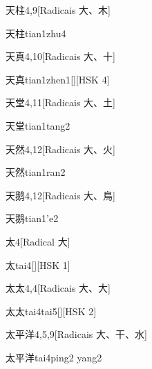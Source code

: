 \begin{entry}{天柱}{4,9}[Radicais ⼤、⽊]
  \begin{phonetics}{天柱}{tian1zhu4}
  \end{phonetics}
\end{entry}

\begin{entry}{天真}{4,10}[Radicais ⼤、⼗]
  \begin{phonetics}{天真}{tian1zhen1}[][HSK 4]
  \end{phonetics}
\end{entry}

\begin{entry}{天堂}{4,11}[Radicais ⼤、⼟]
  \begin{phonetics}{天堂}{tian1tang2}
  \end{phonetics}
\end{entry}

\begin{entry}{天然}{4,12}[Radicais ⼤、⽕]
  \begin{phonetics}{天然}{tian1ran2}
  \end{phonetics}
\end{entry}

\begin{entry}{天鹅}{4,12}[Radicais ⼤、⿃]
  \begin{phonetics}{天鹅}{tian1'e2}
  \end{phonetics}
\end{entry}

\begin{entry}{太}{4}[Radical ⼤]
  \begin{phonetics}{太}{tai4}[][HSK 1]
  \end{phonetics}
\end{entry}

\begin{entry}{太太}{4,4}[Radicais ⼤、⼤]
  \begin{phonetics}{太太}{tai4tai5}[][HSK 2]
  \end{phonetics}
\end{entry}

\begin{entry}{太平洋}{4,5,9}[Radicais ⼤、⼲、⽔]
  \begin{phonetics}{太平洋}{tai4ping2 yang2}
  \end{phonetics}
\end{entry}

